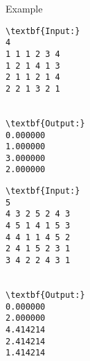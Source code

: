 Example
\begin{verbatim}
\textbf{Input:}
4
1 1 1 2 3 4
1 2 1 4 1 3
2 1 1 2 1 4
2 2 1 3 2 1


\textbf{Output:}
0.000000
1.000000
3.000000
2.000000

\end{verbatim}
\begin{verbatim}
\textbf{Input:}
5
4 3 2 5 2 4 3
4 5 1 4 1 5 3
4 4 1 1 4 5 2
2 4 1 5 2 3 1
3 4 2 2 4 3 1


\textbf{Output:}
0.000000
2.000000
4.414214
2.414214
1.414214

\end{verbatim}
 
 